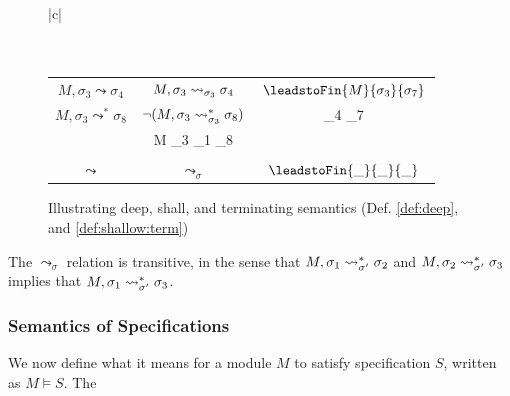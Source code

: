 \begin{figure}[htb]
\begin{tabular}{|c|}
\hline \\
\\
\hline
\\
\begin{tabular}{c|c|c}
$M, {\sigma_3} \leadsto  \sigma_4 $ & 
  $M, \sigma_3 \leadsto_{\sigma_3} \sigma_4 $ & 
  $\leadstoFin {M} {\sigma_3} {\sigma_7}$
\\
 $M, {\sigma_3} \leadsto^*  \sigma_8 $ & 
$\neg(M, \sigma_3 \leadsto^*_{\sigma_3} \sigma_8)$ 
&
\leadstoFin {M} {\sigma_4} {\sigma_7} \\
&
 \leadstoRecStar M {\sigma_3} {\sigma_1}   {\sigma_8}
  &
   \\
 \hline
 \\
 $\leadsto$
 &
 $\leadsto_{\sigma}$
 &
  $\leadstoFin {\_} {\_} {\_}$
\\
\hline
\end{tabular}
\end{tabular}
   \caption{Illustrating  %
   deep, shall, and terminating semantics
     (Def. \ref{def:deep}, and \ref{def:shallow:term})%
    }
   \label{fig:UpSemantics}
 \end{figure}

 
{ The $\leadsto_{\sigma}$ relation is transitive, in the sense that $M, \sigma_1 \leadsto^*_{\sigma'} \sigma_2$ and $M, \sigma_2 \leadsto^*_{\sigma'} \sigma_3$ implies that $M, \sigma_1 \leadsto^*_{\sigma'} \sigma_3$.}
 
 \subsubsection{ Semantics of \SpecLang Specifications}
We now  define what it means for  a module  $M$ to satisfy specification  $S$, written as $M \vDash S$. The
 
